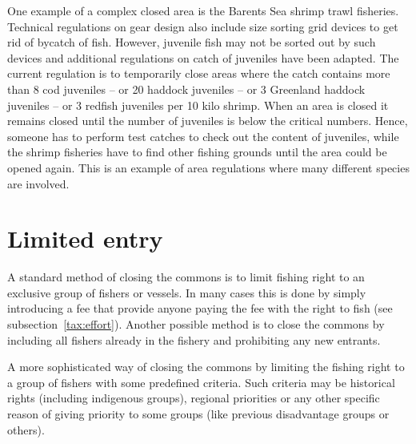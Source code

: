 \documentclass[11pt,fleqn]{book} %
\begin{document}
One example of a complex closed area is the Barents Sea shrimp trawl fisheries. Technical regulations on gear design also include size sorting grid devices to get rid of bycatch of fish. However, juvenile fish may not be sorted out by such devices and additional regulations on catch of juveniles have been adapted. The current regulation is to temporarily close areas where the catch contains more than 8 cod juveniles -- or 20 haddock juveniles -- or 3 Greenland haddock juveniles -- or 3 redfish juveniles per 10 kilo shrimp. When an area is closed it remains closed until the number of juveniles is below the critical numbers\cite{Reithe2004}. Hence, someone has to perform test catches to check out the content of juveniles, while the shrimp fisheries have to find other fishing grounds until the area could be opened again. This is an example of area regulations where many different species are involved.

\section{Limited entry}

A standard method of closing the commons is to limit fishing right to an exclusive group of fishers or vessels. In many cases this is done by simply introducing a fee that provide anyone paying the fee with the right to fish (see subsection~\ref{tax:effort}). Another possible method is to close the commons by including all fishers already in the fishery and prohibiting any new entrants. 

A more sophisticated way of closing the commons by limiting the fishing right to a group of fishers with some predefined criteria. Such criteria may be historical rights (including indigenous groups), regional priorities or any other specific reason of giving priority to some groups (like previous disadvantage groups or others).
\end{document}
